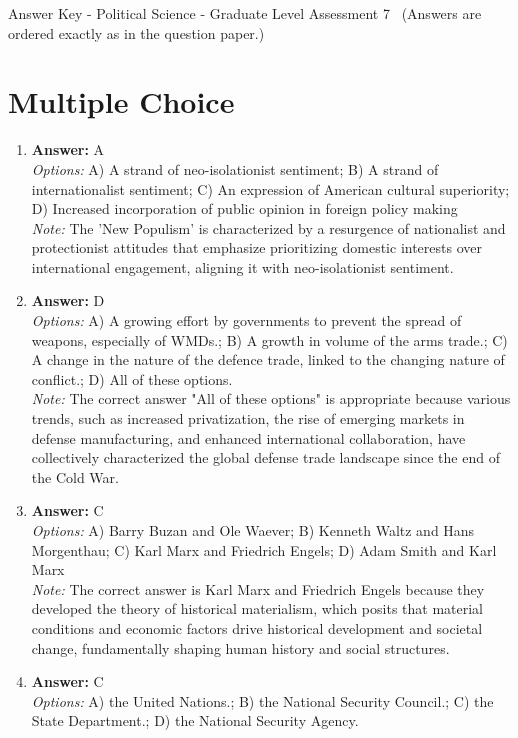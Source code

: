 \documentclass[12pt]{article}
\begin{document}
\begin{center}
Answer Key - Political Science - Graduate Level Assessment 7 \
\small (Answers are ordered exactly as in the question paper.)
\end{center}

\section*{Multiple Choice}
\begin{enumerate}[label=\arabic*.]
\item \textbf{Answer:} A
\\ \textit{Options:} A) A strand of neo-isolationist sentiment; B) A strand of internationalist sentiment; C) An expression of American cultural superiority; D) Increased incorporation of public opinion in foreign policy making
\\ \textit{Note:} The 'New Populism' is characterized by a resurgence of nationalist and protectionist attitudes that emphasize prioritizing domestic interests over international engagement, aligning it with neo-isolationist sentiment.
\item \textbf{Answer:} D
\\ \textit{Options:} A) A growing effort by governments to prevent the spread of weapons, especially of WMDs.; B) A growth in volume of the arms trade.; C) A change in the nature of the defence trade, linked to the changing nature of conflict.; D) All of these options.
\\ \textit{Note:} The correct answer "All of these options" is appropriate because various trends, such as increased privatization, the rise of emerging markets in defense manufacturing, and enhanced international collaboration, have collectively characterized the global defense trade landscape since the end of the Cold War.
\item \textbf{Answer:} C
\\ \textit{Options:} A) Barry Buzan and Ole Waever; B) Kenneth Waltz and Hans Morgenthau; C) Karl Marx and Friedrich Engels; D) Adam Smith and Karl Marx
\\ \textit{Note:} The correct answer is Karl Marx and Friedrich Engels because they developed the theory of historical materialism, which posits that material conditions and economic factors drive historical development and societal change, fundamentally shaping human history and social structures.
\item \textbf{Answer:} C
\\ \textit{Options:} A) the United Nations.; B) the National Security Council.; C) the State Department.; D) the National Security Agency.

\end{enumerate}
\end{document}
